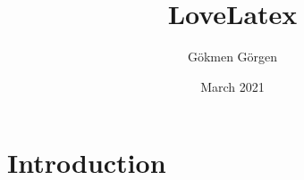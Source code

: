 \documentclass{main}
\title{LoveLatex}
\author{Gökmen Görgen}
\date{March 2021}
\begin{document}
\maketitle

\section{Introduction}
\end{document}

